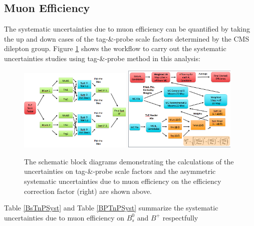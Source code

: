\subsection{Muon Efficiency}

The systematic uncertainties due to muon efficiency can be quantified by taking the up and down cases of the tag-\&-probe scale factors determined by the CMS dilepton group. Figure \ref{MuonEffSystWF} shows the workflow to carry out the systematic uncertainties studies using tag-\&-probe method in this analysis:

\begin{figure}[h]
\begin{center}
\includegraphics[width=0.48\textwidth]{Figures/Chapter5/TnPSystScheme.png}
\includegraphics[width=0.48\textwidth]{Figures/Chapter5/TnPSystCal.png}
\caption{The schematic block diagrams demonstrating the calculations of the uncertainties on tag-\&-probe scale factors and the asymmetric systematic uncertainties due to muon efficiency on the efficiency correction factor (right) are shown above.} 
\label{MuonEffSystWF} 
\end{center}
\end{figure}

Table \ref{BsTnPSyst} and Table \ref{BPTnPSyst} summarize the systematic uncertainties due to muon efficiency on $B^0_s$ and $B^+$ respectfully


